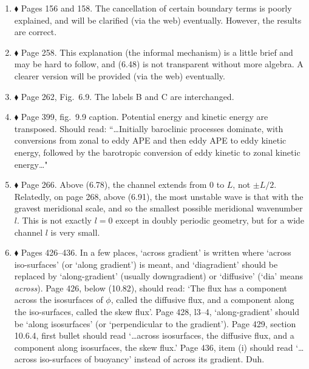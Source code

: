 \documentclass[10pt]{article}
\renewcommand{\star}{\ensuremath{\blacklozenge} }
\begin{document}
\begin{enumerate}

\item \star \label{cancel} Pages 156 and 158. The cancellation of certain boundary terms is poorly explained, and will be clarified (via the web) eventually. However, the results are correct.

\item \star \label{informal} Page 258. This explanation (the informal mechanism) is a little brief and may be hard to follow, and (6.48) is not transparent without more algebra. A clearer version will be provided (via the web) eventually.

\item \star \label{eadyschem} Page 262, Fig.\ 6.9. The labels {\sf B} and {\sf C} are interchanged.

\item \star \label{simmhosk} Page 399, fig.\ 9.9 caption.  Potential energy and kinetic energy are transposed. Should read: ``\ldots Initially baroclinic processes dominate, with conversions from zonal to eddy APE and then eddy APE to eddy kinetic energy, followed by the barotropic conversion of eddy kinetic to zonal kinetic energy\ldots"

\item \star \label{channel} Page 266. Above (6.78), the channel extends from $0$ to $L$, not $\pm L/2$. Relatedly, on page 268, above (6.91), the most unstable wave is that with the gravest meridional scale, and so the smallest possible meridional wavenumber $l$. This is not exactly $l=0$ except in doubly periodic geometry, but for a wide channel $l$ is very small.


\item \star Pages 426--436. In a few places, `across gradient' is written where `across iso-surfaces' (or `along gradient') is meant, and  `diagradient' should be replaced by `along-gradient' (usually downgradient) or `diffusive' (`dia' means \emph{across}). Page 426, below (10.82), should read: `The flux has a component across the isosurfaces of $\phi$, called the
diffusive flux, and a component along the iso-surfaces, called the skew flux'. Page 428, l3--4, `along-gradient' should be `along isosurfaces' (or `perpendicular to the gradient'). Page 429, section 10.6.4, first bullet should read `\ldots across isosurfaces, the diffusive flux, and a component along isosurfaces, the skew flux.'  Page 436, item (i) should read `\ldots across iso-surfaces of buoyancy' instead of across its gradient. Duh.


\end{enumerate}
\end{document}
